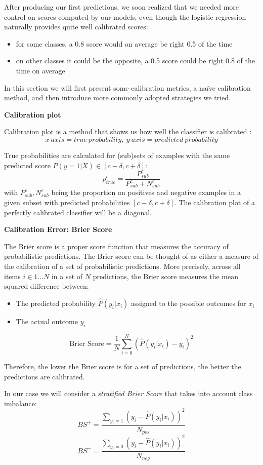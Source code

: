 After producing our first predictions, we soon realized that we needed more control on scores computed by our models, even though the logistic regression naturally provides quite well calibrated scores:
\begin{itemize}
	\item for some classes, a 0.8 score would on average be right 0.5 of the time
	\item on other classes it could be the opposite, a 0.5 score could be right 0.8 of the time on average
\end{itemize}

In this section we will first present some calibration metrics, a naïve calibration method, and then introduce more commonly adopted strategies we tried.

\textbf{Calibration plot}

Calibration plot is a method that shows us how well the classifier is calibrated \cite{Calibration}: $$x\ axis = true\ probability,\ y\ axis=predicted\ probability$$

True probabilities are calculated for (sub)sets of examples with the same predicted score $P(y=1|X) \in [c-\delta, c+\delta]$: $$ p_{true}^c = \frac{P_{sub}^c}{P_{sub}^c + N_{sub}^c}$$ with $P_{sub}^c, N_{sub}^c$ being the proportion on positives and negative examples in a given subset with predicted probabilities $[c-\delta, c+\delta]$. The calibration plot of a perfectly calibrated classifier will be a diagonal.

\textbf{Calibration Error: Brier Score}

The Brier score is a proper score function that measures the accuracy of probabilistic predictions. The Brier score can be thought of as either a measure of the calibration of a set of probabilistic predictions. More precisely, across all items $i\in{1...N}$ in a set of $N$ predictions, the Brier score measures the mean squared difference between:
\begin{itemize}
    \item The predicted probability $\hat{P}(y_i|x_i)$ assigned to the possible outcomes for $x_i$
    \item The actual outcome $y_i$
\end{itemize}
$$\text{Brier Score} = \frac{1}{N} \sum \limits_{i=0}^N (\hat{P}(y_i|x_i) - y_i)^2$$

Therefore, the lower the Brier score is for a set of predictions, the better the predictions are calibrated. \cite{wiki15, Ya91}

In our case we will consider a \textit{stratified Brier Score} that takes into account class imbalance:
$$BS^+ = \frac{\sum \limits_{y_i=1} (y_i - \hat{P}(y_i|x_i))^2}{N_{pos}}$$
$$BS^- = \frac{\sum \limits_{y_i=0} (y_i - \hat{P}(y_i|x_i))^2}{N_{neg}}$$


